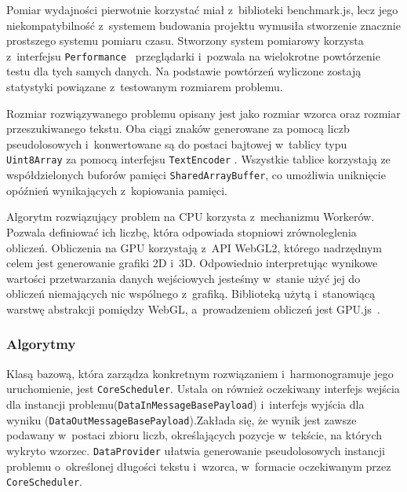 Pomiar wydajności pierwotnie korzystać miał z~biblioteki benchmark.js, lecz jego niekompatybilność z~systemem budowania projektu wymusiła stworzenie znacznie prostszego systemu pomiaru czasu. Stworzony system pomiarowy korzysta z~interfejsu \texttt{Performance}~\cite{HRT} przeglądarki i~pozwala na wielokrotne powtórzenie testu dla tych samych danych. Na podstawie powtórzeń wyliczone zostają statystyki powiązane z~testowanym rozmiarem problemu.

Rozmiar rozwiązywanego problemu opisany jest jako rozmiar wzorca oraz rozmiar przeszukiwanego tekstu. Oba ciągi znaków generowane za pomocą liczb pseudolosowych i~konwertowane są do postaci bajtowej w~tablicy typu \texttt{Uint8Array} za pomocą interfejsu \texttt{TextEncoder} \cite{TextEncoder}. Wszystkie tablice korzystają ze współdzielonych buforów pamięci \texttt{SharedArrayBuffer}, co umożliwia uniknięcie opóźnień wynikających z~kopiowania pamięci.

Algorytm rozwiązujący problem na CPU korzysta z~mechanizmu Workerów. Pozwala definiować ich liczbę, która odpowiada stopniowi zrównoleglenia obliczeń. Obliczenia na GPU korzystają z~API WebGL2, którego nadrzędnym celem jest generowanie grafiki 2D i~3D. Odpowiednio interpretując wynikowe wartości przetwarzania danych wejściowych jesteśmy w~stanie użyć jej do obliczeń niemających nic wspólnego z~grafiką. Biblioteką użytą i~stanowiącą warstwę abstrakcji pomiędzy WebGL, a~prowadzeniem obliczeń jest GPU.js~\cite{GPU.js}.

\subsubsection{Algorytmy}

Klasą bazową, która zarządza konkretnym rozwiązaniem i~harmonogramuje jego uruchomienie, jest \texttt{CoreScheduler}. Ustala on również oczekiwany interfejs wejścia dla instancji problemu\linebreak (\texttt{DataInMessageBasePayload}) i~interfejs wyjścia dla wyniku (\texttt{DataOutMessageBasePayload}).\linebreak Zakłada się, że wynik jest zawsze podawany w~postaci zbioru liczb, określających pozycje w~tekście, na których wykryto wzorzec. \texttt{DataProvider} ułatwia generowanie pseudolosowych instancji problemu o~określonej długości tekstu i~wzorca, w~formacie oczekiwanym przez \texttt{CoreScheduler}.

